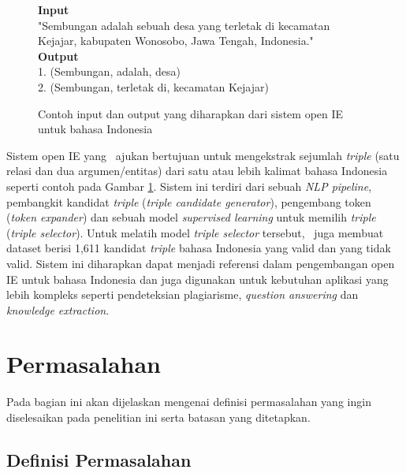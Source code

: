 \begin{figure}
	\begin{mdframed}
		\textbf{Input} \\
		"Sembungan adalah sebuah desa yang terletak di kecamatan Kejajar, kabupaten Wonosobo, Jawa Tengah, Indonesia." \\
		
		\textbf{Output} \\
		1. (Sembungan, adalah, desa) \\
		2. (Sembungan, terletak di, kecamatan Kejajar)
	\end{mdframed}
	\caption{Contoh input dan output yang diharapkan dari sistem open IE untuk bahasa Indonesia}
	\label{fig:example_io_openie}
\end{figure}

Sistem open IE yang \saya~ajukan bertujuan untuk mengekstrak sejumlah \textit{triple} (satu relasi dan dua argumen/entitas) dari satu atau lebih kalimat bahasa Indonesia seperti contoh pada Gambar \ref{fig:example_io_openie}. Sistem ini terdiri dari sebuah \textit{NLP pipeline}, pembangkit kandidat \textit{triple} (\textit{triple candidate generator}), pengembang token (\textit{token expander}) dan sebuah model \textit{supervised learning} untuk memilih \textit{triple} (\textit{triple selector}). Untuk melatih model \textit{triple selector} tersebut, \saya~juga membuat dataset berisi 1,611 kandidat \textit{triple} bahasa Indonesia yang valid dan yang tidak valid. Sistem ini diharapkan dapat menjadi referensi dalam pengembangan open IE untuk bahasa Indonesia dan juga digunakan untuk kebutuhan aplikasi yang lebih kompleks seperti pendeteksian plagiarisme, \textit{question answering} dan \textit{knowledge extraction}.

\section{Permasalahan}
Pada bagian ini akan dijelaskan mengenai definisi permasalahan yang ingin diselesaikan pada penelitian ini serta batasan yang ditetapkan.


\subsection{Definisi Permasalahan}

